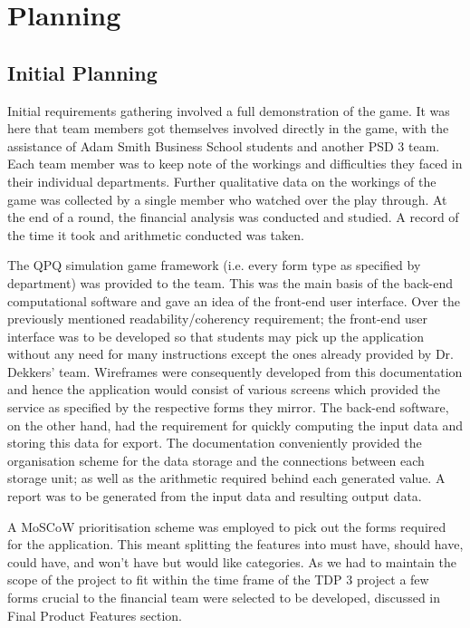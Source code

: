 \documentclass{l3proj}
\begin{document}
\section{Planning}
\label{sec:planning}

\subsection{Initial Planning}
Initial requirements gathering involved a full demonstration of the game. It was here that team members got themselves involved directly in the game, with the assistance of Adam Smith Business School students and another PSD 3 team. Each team member was to keep note of the workings and difficulties they faced in their individual departments. Further qualitative data on the workings of the game was collected by a single member who watched over the play through. At the end of a round, the financial analysis was conducted and studied. A record of the time it took and arithmetic conducted was taken.

The QPQ simulation game framework (i.e. every form type as specified by department) was provided to the team. This was the main basis of the back-end computational software and gave an idea of the front-end user interface. Over the previously mentioned readability/coherency requirement; the front-end user interface was to be developed so that students may pick up the application without any need for many instructions except the ones already provided by Dr. Dekkers' team. Wireframes were consequently developed from this documentation and hence the application would consist of various screens which provided the service as specified by the respective forms they mirror. The back-end software, on the other hand, had the requirement for quickly computing the input data and storing this data for export. The documentation conveniently provided the organisation scheme for the data storage and the connections between each storage unit; as well as the arithmetic required behind each generated value. A report was to be generated from the input data and resulting output data.
    
A MoSCoW prioritisation scheme was employed to pick out the forms required for the application. This meant splitting the features into must have, should have, could have, and won't have but would like categories. As we had to maintain the scope of the project to fit within the time frame of the TDP 3 project a few forms crucial to the financial team were selected to be developed, discussed in Final Product Features section.
\end{document}
